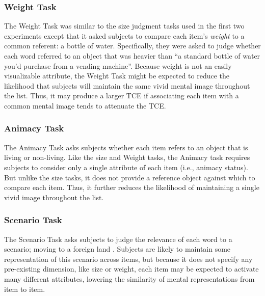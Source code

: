 \documentclass[jou,natbib]{apa6} %
\begin{document}
\subsubsection{Weight Task} The Weight Task was similar to the size judgment tasks used in the first two experiments except that it asked subjects to compare each item's \emph{weight} to a common referent: a bottle of water. Specifically, they were asked to judge whether each word referred to an object that was heavier than ``a standard bottle of water you'd purchase from a vending machine''. Because weight is not an easily visualizable attribute, the Weight Task might be expected to reduce the likelihood that subjects will maintain the same vivid mental image throughout the list. Thus, it may produce a larger TCE if associating each item with a common mental image tends to attenuate the TCE.

\subsubsection{Animacy Task} The Animacy Task asks subjects whether each item refers to an object that is living or non-living. Like the size and Weight tasks, the Animacy task requires subjects to consider only a single attribute of each item (i.e., animacy status). But unlike the size tasks, it does not provide a reference object against which to compare each item. Thus, it further reduces the likelihood of maintaining a single vivid image throughout the list. 

\subsubsection{Scenario Task} The Scenario Task asks subjects to judge the relevance of each word to a scenario; moving to a foreign land \citep{NairEtal16}. Subjects are likely to maintain some representation of this scenario across items, but because it does not specify any pre-existing dimension, like size or weight, each item may be expected to activate many different attributes, lowering the similarity of mental representations from item to item.
\end{document}
